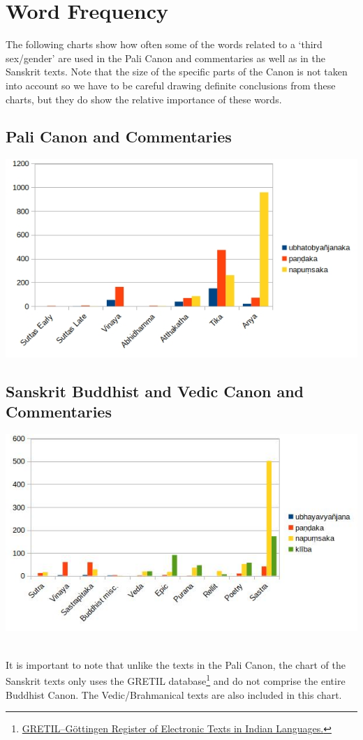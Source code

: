 \section{Word Frequency}
\label{appendix2}

The following charts show how often some of the words related to a `third sex/gender' are used in the Pali Canon and commentaries as well as in the Sanskrit texts. Note that the size of the specific parts of the Canon is not taken into account so we have to be careful drawing definite conclusions from these charts, but they do show the relative importance of these words. 

\subsection{Pali Canon and Commentaries}

\includegraphics[width=0.7\linewidth]{pali.jpg}

\begin{minipage}{0.8\linewidth}
\end{minipage}
\label{pali1}

\subsection{Sanskrit Buddhist and Vedic Canon and Commentaries}

\includegraphics[width=0.7\linewidth]{sanskrit.jpg}

\begin{minipage}{0.7\linewidth}
\end{minipage}
\label{sanskrit1}
\medskip
\\
It is important to note that unlike the texts in the Pali Canon, the chart of the Sanskrit texts only uses the GRETIL database\footnote{\href{http://gretil.sub.uni-goettingen.de/gretil.html}{GRETIL--Göttingen Register of Electronic Texts in Indian Languages.}} and do not comprise the entire Buddhist Canon. The Vedic/Brahmanical texts are also included in this chart.
